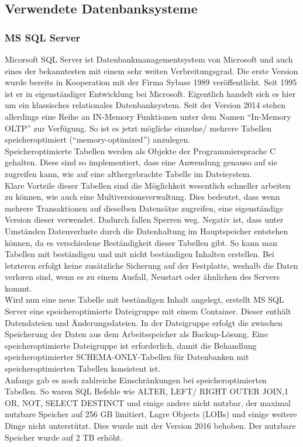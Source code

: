 \documentclass[a4paper, 12pt]{scrartcl}
\begin{document}
\subsection{Verwendete Datenbanksysteme}
\subsubsection{MS SQL Server}
Micorsoft SQL Server ist Datenbankmanagementsystem von Microsoft und auch eines der bekanntesten mit einem sehr weiten Verbreitungsgrad. Die erste Version wurde bereits in Kooperation mit der Firma Sybase 1989 veröffentlicht. Seit 1995 ist er in eigenständiger Entwicklung bei Microsoft. Eigentlich handelt sich es hier um ein klassisches relationales Datenbanksystem. Seit der Version 2014 stehen allerdings eine Reihe an IN-Memory Funktionen unter dem Namen "`In-Memory OLTP"' zur Verfügung. So ist es jetzt mögliche einzelne/ mehrere Tabellen speicheroptimiert ("`memory-optimized"') anzulegen. \\ Speicheroptimierte Tabellen werden als Objekte der Programmiersprache C gehalten. Diese sind so implementiert, dass eine Anwendung genauso auf sie zugreifen kann, wie auf eine althergebrachte Tabelle im Dateisystem.\\ Klare Vorteile dieser Tabellen sind die Möglichkeit wesentlich schneller arbeiten zu können, wie auch eine Multiversionsverwaltung. Dies bedeutet, dass wenn mehrere Transaktionen auf dieselben Datensätze zugreifen, eine eigenständige Version dieser verwendet. Dadurch fallen Sperren weg. Negativ ist, dass unter Umständen Datenverluste durch die Datenhaltung im Hauptspeicher entstehen können, da es verschiedene Beständigkeit dieser Tabellen gibt. So kann man Tabellen mit beständigen und mit nicht beständigen Inhalten erstellen. Bei letzteren erfolgt keine zusätzliche Sicherung auf der Festplatte, weshalb die Daten verloren sind, wenn es zu einem Ausfall, Neustart oder ähnlichen des Servers kommt.\\ Wird nun eine neue Tabelle mit beständigen Inhalt angelegt, erstellt MS SQL Server eine speicheroptimierte Dateigruppe mit einem Container. Dieser enthält Datendateien und Änderungsdateien. In der Dateigruppe erfolgt die zwischen Speicherung der Daten aus dem Arbeitsspeicher als Backup-Lösung. Eine speicheroptimierte Dateigruppe ist erforderlich, damit die Behandlung speicheroptimierter SCHEMA-ONLY-Tabellen für Datenbanken mit speicheroptimierten Tabellen konsistent ist. \\ Anfangs gab es noch zahlreiche Einschränkungen bei speicheroptimierten Tabellen. So waren SQL Befehle wie ALTER, LEFT/ RIGHT OUTER JOIN,1 OR, NOT, SELECT DESTINCT und einige andere nicht nutzbar, der maximal nutzbare Speicher auf 256 GB limitiert, Lagre Objects (LOBs) und einige weitere Dinge nicht unterstützt. Dies wurde mit der Version 2016 behoben. Der nutzbare Speicher wurde auf 2 TB erhöht. 
 
\end{document}
